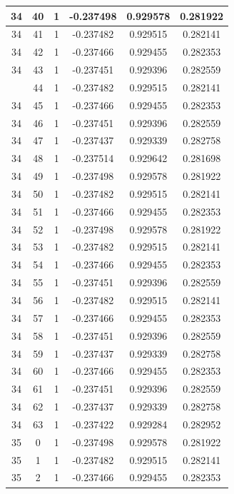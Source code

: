 \documentclass[12pt,a4paper]{article}
\numberwithin{equation}{section}
\numberwithin{figure}{section}
\numberwithin{table}{section}
\begin{document}
\begin{longtable}{|c|c|c|c|c|c|}
34 & 40 & 1 & -0.237498 & 0.929578 & 0.281922 \\ \hline
34 & 41 & 1 & -0.237482 & 0.929515 & 0.282141 \\ \hline
34 & 42 & 1 & -0.237466 & 0.929455 & 0.282353 \\ \hline
34 & 43 & 1 & -0.237451 & 0.929396 & 0.282559 \\ \hline
\pagebreak
34 & 44 & 1 & -0.237482 & 0.929515 & 0.282141 \\ \hline
34 & 45 & 1 & -0.237466 & 0.929455 & 0.282353 \\ \hline
34 & 46 & 1 & -0.237451 & 0.929396 & 0.282559 \\ \hline
34 & 47 & 1 & -0.237437 & 0.929339 & 0.282758 \\ \hline
34 & 48 & 1 & -0.237514 & 0.929642 & 0.281698 \\ \hline
34 & 49 & 1 & -0.237498 & 0.929578 & 0.281922 \\ \hline
34 & 50 & 1 & -0.237482 & 0.929515 & 0.282141 \\ \hline
34 & 51 & 1 & -0.237466 & 0.929455 & 0.282353 \\ \hline
34 & 52 & 1 & -0.237498 & 0.929578 & 0.281922 \\ \hline
34 & 53 & 1 & -0.237482 & 0.929515 & 0.282141 \\ \hline
34 & 54 & 1 & -0.237466 & 0.929455 & 0.282353 \\ \hline
34 & 55 & 1 & -0.237451 & 0.929396 & 0.282559 \\ \hline
34 & 56 & 1 & -0.237482 & 0.929515 & 0.282141 \\ \hline
34 & 57 & 1 & -0.237466 & 0.929455 & 0.282353 \\ \hline
34 & 58 & 1 & -0.237451 & 0.929396 & 0.282559 \\ \hline
34 & 59 & 1 & -0.237437 & 0.929339 & 0.282758 \\ \hline
34 & 60 & 1 & -0.237466 & 0.929455 & 0.282353 \\ \hline
34 & 61 & 1 & -0.237451 & 0.929396 & 0.282559 \\ \hline
34 & 62 & 1 & -0.237437 & 0.929339 & 0.282758 \\ \hline
34 & 63 & 1 & -0.237422 & 0.929284 & 0.282952 \\ \hline
35 & 0 & 1 & -0.237498 & 0.929578 & 0.281922 \\ \hline
35 & 1 & 1 & -0.237482 & 0.929515 & 0.282141 \\ \hline
35 & 2 & 1 & -0.237466 & 0.929455 & 0.282353 \\ \hline

\end{longtable}
\end{document}
